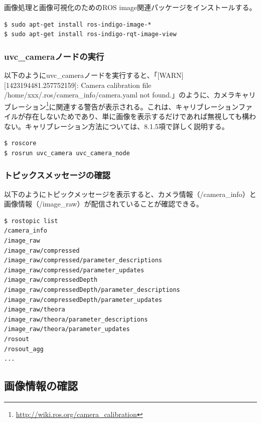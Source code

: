 画像処理と画像可視化のためのROS image関連パッケージをインストールする。

\begin{lstlisting}[language=ROS]
$ sudo apt-get install ros-indigo-image-*
$ sudo apt-get install ros-indigo-rqt-image-view
\end{lstlisting}

\subsubsection{uvc\_cameraノードの実行}

以下のようにuvc\_cameraノードを実行すると、「[WARN] [1423194481.257752159]: Camera calibration file /home/xxx/.ros/camera\_info/camera.yaml not found.」のように、カメラキャリブレーション\footnote{\url{http://wiki.ros.org/camera\_calibration}}に関連する警告が表示される。これは、キャリブレーションファイルが存在しないためであり、単に画像を表示するだけであれば無視しても構わない。キャリブレーション方法については、8.1.5項で詳しく説明する。

\begin{lstlisting}[language=ROS]
$ roscore
$ rosrun uvc_camera uvc_camera_node
\end{lstlisting}

\subsubsection{トピックスメッセージの確認}

以下のようにトピックメッセージを表示すると、カメラ情報（/camera\_info）と画像情報（/image\_raw）が配信されていることが確認できる。

\begin{lstlisting}[language=ROS]
$ rostopic list
/camera_info
/image_raw
/image_raw/compressed
/image_raw/compressed/parameter_descriptions /image_raw/compressed/parameter_updates
/image_raw/compressedDepth
/image_raw/compressedDepth/parameter_descriptions /image_raw/compressedDepth/parameter_updates
/image_raw/theora
/image_raw/theora/parameter_descriptions
/image_raw/theora/parameter_updates
/rosout
/rosout_agg
...
\end{lstlisting}

\subsection{画像情報の確認}

